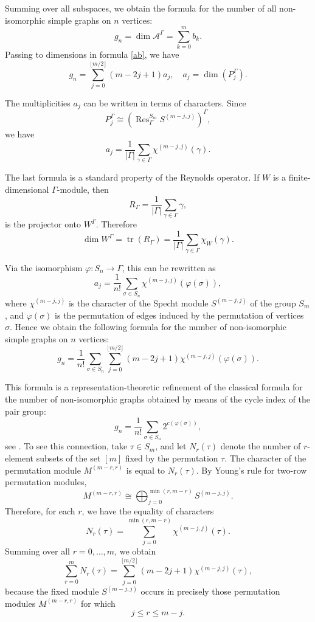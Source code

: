 \documentclass[12pt,reqno]{amsart}
\begin{document}
Summing over all subspaces, we obtain the formula for the number of all
non-isomorphic simple graphs on \(n\) vertices:
$$
g_n=\dim\mathcal A^\Gamma
=
\sum_{k=0}^{m}b_k.
$$
Passing to dimensions in formula \eqref{ab}, we have
$$
g_n
=
\sum_{j=0}^{\lfloor m/2\rfloor}
(m-2j+1)a_j, \quad a_j=\dim (P_j^\Gamma).
$$

The multiplicities \(a_j\) can be written in terms of characters. Since
$$
P_j^\Gamma
\cong
\left(\operatorname{Res}^{S_m}_{\Gamma}S^{(m-j,j)}\right)^\Gamma,
$$
we have
$$
a_j
=
\frac1{|\Gamma|}
\sum_{\gamma\in\Gamma}
\chi^{(m-j,j)}(\gamma).
$$

The last formula is a standard property of the Reynolds operator. If \(W\) is
a finite-dimensional \(\Gamma\)-module, then
$$
R_\Gamma=\frac1{|\Gamma|}\sum_{\gamma\in\Gamma}\gamma,
$$
is the projector onto \(W^\Gamma\). Therefore
$$
\dim W^\Gamma=\operatorname{tr}(R_\Gamma)
=
\frac1{|\Gamma|}\sum_{\gamma\in\Gamma}\chi_W(\gamma).
$$

Via the isomorphism \(\varphi:S_n\to\Gamma\), this can be rewritten as
$$
a_j
=
\frac1{n!}
\sum_{\sigma\in S_n}
\chi^{(m-j,j)}(\varphi(\sigma)),
$$
where \(\chi^{(m-j,j)}\) is the character of the Specht module
\(S^{(m-j,j)}\) of the group \(S_m\), and \(\varphi(\sigma)\) is the
permutation of edges induced by the permutation of vertices \(\sigma\).
Hence we obtain the following formula for the number of non-isomorphic simple
graphs on \(n\) vertices:
$$
g_n
=
\frac1{n!}
\sum_{\sigma\in S_n}
\sum_{j=0}^{\lfloor m/2\rfloor}
(m-2j+1)
\chi^{(m-j,j)}(\varphi(\sigma)).
$$

This formula is a representation-theoretic refinement of the classical
formula for the number of non-isomorphic graphs obtained by means of the
cycle index of the pair group:
$$
g_n
=
\frac1{n!}
\sum_{\sigma\in S_n}
2^{c(\varphi(\sigma))},
$$
see \cite{H-P}.
To see this connection, take \(\tau\in S_m\), and let \(N_r(\tau)\) denote
the number of \(r\)-element subsets of the set \([m]\) fixed by the
permutation \(\tau\). The character of the permutation module
\(M^{(m-r,r)}\) is equal to \(N_r(\tau)\).
By Young's rule for two-row permutation modules,
$$
M^{(m-r,r)}
\cong
\bigoplus_{j=0}^{\min(r,m-r)}
S^{(m-j,j)}.
$$
Therefore, for each \(r\), we have the equality of characters
$$
N_r(\tau)
=
\sum_{j=0}^{\min(r,m-r)}
\chi^{(m-j,j)}(\tau).
$$
Summing over all \(r=0,\dots,m\), we obtain
$$
\sum_{r=0}^{m}N_r(\tau)
=
\sum_{j=0}^{\lfloor m/2\rfloor}
(m-2j+1)\chi^{(m-j,j)}(\tau),
$$
because the fixed module \(S^{(m-j,j)}\) occurs in precisely those
permutation modules \(M^{(m-r,r)}\) for which
$$
j\le r\le m-j.
$$
\end{document}
